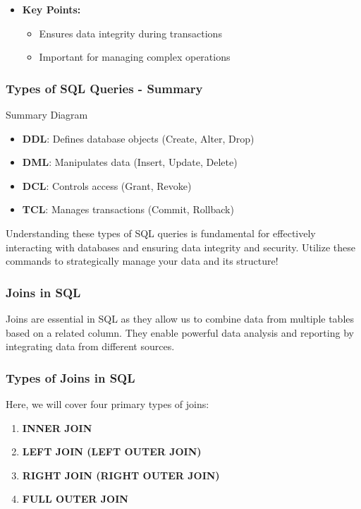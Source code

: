 \documentclass[aspectratio=169]{beamer}
\begin{document}
\begin{frame}[fragile]
\begin{itemize}
        \item \textbf{Key Points:}
        \begin{itemize}
            \item Ensures data integrity during transactions
            \item Important for managing complex operations
        \end{itemize}
    \end{itemize}
\end{frame}

\begin{frame}[fragile]
    \frametitle{Types of SQL Queries - Summary}
    \begin{block}{Summary Diagram}
        \begin{itemize}
            \item \textbf{DDL}: Defines database objects (Create, Alter, Drop)
            \item \textbf{DML}: Manipulates data (Insert, Update, Delete)
            \item \textbf{DCL}: Controls access (Grant, Revoke)
            \item \textbf{TCL}: Manages transactions (Commit, Rollback)
        \end{itemize}
    \end{block}
    
    Understanding these types of SQL queries is fundamental for effectively interacting with databases and ensuring data integrity and security. 
    Utilize these commands to strategically manage your data and its structure!
\end{frame}

\begin{frame}[fragile]
    \frametitle{Joins in SQL}
    Joins are essential in SQL as they allow us to combine data from multiple tables based on a related column. 
    They enable powerful data analysis and reporting by integrating data from different sources.
\end{frame}

\begin{frame}[fragile]
    \frametitle{Types of Joins in SQL}
    Here, we will cover four primary types of joins:
    
    \begin{enumerate}
        \item \textbf{INNER JOIN}
        \item \textbf{LEFT JOIN (LEFT OUTER JOIN)}
        \item \textbf{RIGHT JOIN (RIGHT OUTER JOIN)}
        \item \textbf{FULL OUTER JOIN}
    \end{enumerate}
\end{frame}
\end{document}
